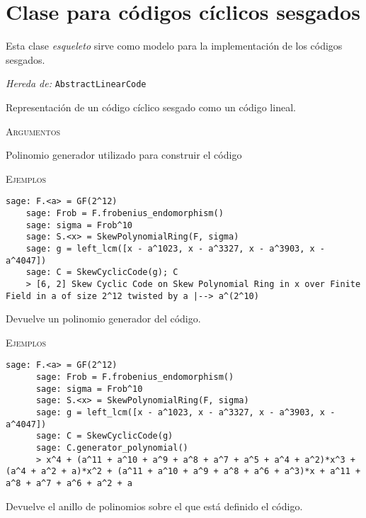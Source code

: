 \section{Clase para códigos cíclicos sesgados}

Esta clase \emph{esqueleto} sirve como modelo para la implementación de los códigos  sesgados.

\begin{description}[leftmargin=1em, font=\normalfont\ttfamily, style=nextline]
  \item[class SkewCyclicCode(self, generator\_pol=None)]
  
  \emph{Hereda de:} \texttt{AbstractLinearCode}

  Representación de un código cíclico sesgado como un código lineal.

  \textsc{Argumentos}
  \begin{description}[font=\normalfont\ttfamily]
    \item[generator\_pol] Polinomio generador utilizado para construir el código
  \end{description}

  \textsc{Ejemplos}
  \begin{lstlisting}[gobble=4]
    sage: F.<a> = GF(2^12)
    sage: Frob = F.frobenius_endomorphism()
    sage: sigma = Frob^10
    sage: S.<x> = SkewPolynomialRing(F, sigma)
    sage: g = left_lcm([x - a^1023, x - a^3327, x - a^3903, x - a^4047])
    sage: C = SkewCyclicCode(g); C
    > [6, 2] Skew Cyclic Code on Skew Polynomial Ring in x over Finite Field in a of size 2^12 twisted by a |--> a^(2^10)
  \end{lstlisting}

  \begin{description}[font=\ttfamily, style=nextline]
    \item[generator\_polynomial()] Devuelve un polinomio generador del código.
    
    \textsc{Ejemplos}
    \begin{lstlisting}[gobble=6]
      sage: F.<a> = GF(2^12)
      sage: Frob = F.frobenius_endomorphism()
      sage: sigma = Frob^10
      sage: S.<x> = SkewPolynomialRing(F, sigma)
      sage: g = left_lcm([x - a^1023, x - a^3327, x - a^3903, x - a^4047])
      sage: C = SkewCyclicCode(g)
      sage: C.generator_polynomial()
      > x^4 + (a^11 + a^10 + a^9 + a^8 + a^7 + a^5 + a^4 + a^2)*x^3 + (a^4 + a^2 + a)*x^2 + (a^11 + a^10 + a^9 + a^8 + a^6 + a^3)*x + a^11 + a^8 + a^7 + a^6 + a^2 + a
    \end{lstlisting}
    \item[polynomial\_ring()] Devuelve el anillo de polinomios sobre el que está definido el código.
     

\end{description}
\end{description}
